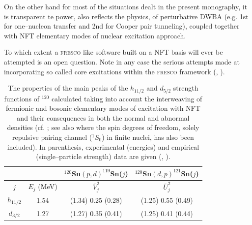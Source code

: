 \documentclass[a4paper,11pt]{book}
\numberwithin{equation}{section}
\numberwithin{figure}{section}
\numberwithin{table}{section}
\begin{document}
On the other hand for most of the situations dealt in the present monography, it is transparent te power, also reflects the physics, of perturbative DWBA (e.g. 1st for one--nucleon transfer and 2nd for Cooper pair tunneling), coupled together 
with NFT elementary modes of nuclear excitation approach.


To which extent a \textsc{fresco} like software built on a NFT basis will ever be attempted is an open question. Note in any case the serious attempts made at incorporating so called core excitations within the \textsc{fresco} framework (\cite{Fernandez:10}, \cite{Fernandez:10b}). 


\begin{table}
\begin{tabular}{|c|c|c|c|}
\hline  &  & $^{120}$Sn$(p,d)^{119}$Sn($j$) & $^{120}$Sn$(d,p)^{121}$Sn($j$) \\ 
\hline $j$ & $E_j$ (MeV) & $\bar V_j^2$ & $\bar U_j^2$ \\ 
\hline $h_{11/2}$ & 1.54 &  (1.34) 0.25 (0.28) & (1.25) 0.55 (0.49) \\ 
\hline $d_{3/2}$ & 1.27  & (1.27) 0.35 (0.41) & (1.25) 0.41 (0.44)  \\ 
\hline 
\end{tabular}\caption{The properties of the main peaks of the $h_{11/2}$ and $d_{5/2}$ strength functions of $^{120}$ calculated taking into account the interweaving of fermionic and bosonic elementary modes of excitation with NFT and their consequences in both the normal and abnormal densities (cf. \cite{Idini:12}; \cite{Idini:13} see also \cite{Idini:14} where the spin degrees of freedom, solely repulsive pairing channel ($^1S_0$) in finite nuclei, has also been included). In parenthesis, experimental (energies) and empirical (single--particle strength) data are given (\cite{Bechara:75}, \cite{Dickey:82}).}\label{tab6.2.1}
\end{table}




 
 
\end{document}
